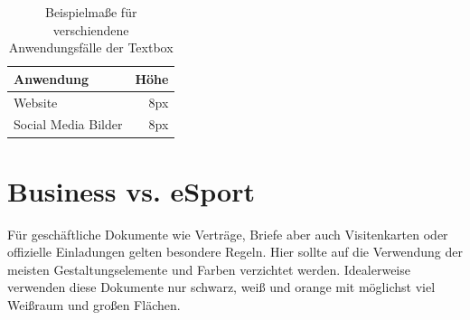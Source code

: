\documentclass{article}
\begin{document}
\begin{table}[hb]
\begin{center}
\begin{tabular}{ | l | r | }
\hline
  Anwendung & Höhe \\
\hline
  Website & 8px \\
\hline
  Social Media Bilder & 8px \\
\hline
\end{tabular}
\end{center}
\caption{Beispielmaße für verschiendene Anwendungsfälle der Textbox}
\end{table}


\section{Business vs. eSport}

Für geschäftliche Dokumente wie Verträge, Briefe aber auch Visitenkarten oder offizielle Einladungen gelten besondere Regeln. Hier sollte auf die Verwendung der meisten Gestaltungselemente und Farben verzichtet werden. Idealerweise verwenden diese Dokumente nur schwarz, weiß und orange mit möglichst viel Weißraum und großen Flächen.

\end{document}
